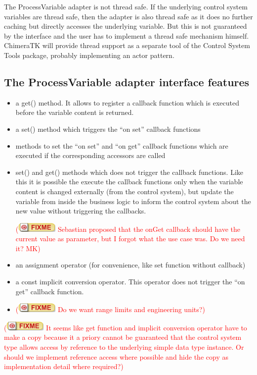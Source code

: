 \documentclass[11pt,a4paper]{scrartcl}
\newcounter{nFixmes}
\newcommand{\fixme}[1]{\addtocounter{nFixmes}{1}\textcolor{red}{(\includegraphics[height=2ex]{fixme} #1)}\xspace}
\begin{document}
The ProcessVariable adapter is not thread safe. If the underlying control
system variables are thread safe, then the adapter is also thread safe as it
does no further caching but directly accesses the underlying variable. But this
is not guaranteed by the interface and the user has to implement a thread safe
mechanism himself. ChimeraTK will provide thread support as a separate tool of
the Control System Tools package, probably implementing an actor pattern.

\subsection{The ProcessVariable adapter interface features}
\begin{itemize}
\item a get() method. It allows to register a callback function which is executed before
  the variable content is returned.
\item a set() method which triggers the ``on set'' callback functions
\item methods to set the ``on set'' and ``on get'' callback functions which are executed 
  if the corresponding accessors are called
\item set() and get() methods which does not trigger the callback functions. Like this
  it is possible the execute the callback functions only when the variable
  content is changed externally (from the control system), but update the
  variable from inside the business logic to inform the control system about
  the new value without triggering the callbacks. 
  \fixme{Sebastian proposed that the onGet callback should have the current value as parameter, 
    but I forgot what the use case was. Do we need it? MK}
\item an assignment operator (for convenience, like set function without
  callback)
\item a const implicit conversion operator. This operator does not trigger the ``on get'' callback
  function.
\item \fixme{Do we want range limits and engineering units?}
\end{itemize}
\fixme{It seems like get function and implicit conversion operator have to make a copy
  because it a priory cannot be guaranteed that the control system type allows
  access by reference to the underlying simple data type instance. Or should we implement 
  reference access where possible and hide the copy as implementation detail where required?}
\end{document}
